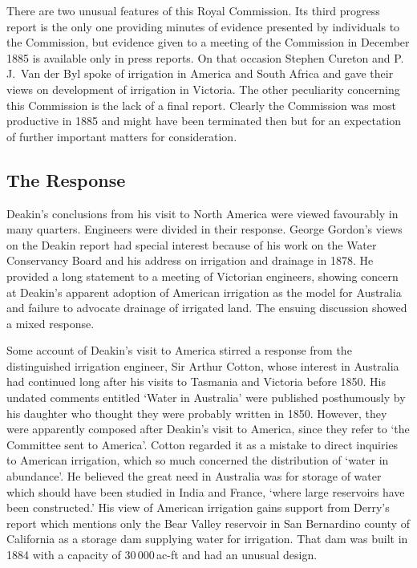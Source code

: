 There are two unusual features of this Royal Commission.  Its third
progress report is the only one providing minutes of evidence
presented by individuals to the Commission, but evidence given to a
meeting of the Commission in December 1885 is available only in press
reports.  On that occasion Stephen Cureton and P.\,J.~Van der Byl
spoke of irrigation in America and South Africa and gave their views
on development of irrigation in Victoria.  The other peculiarity concerning this Commission is the
lack of a final report.  Clearly the Commission was most productive in
1885 and might have been terminated then but for an expectation of
further important matters for consideration.

\subsection*{The Response}

Deakin's conclusions from his visit to North America were viewed
favourably in many quarters.  Engineers were divided in their
response.  George Gordon's views on the Deakin report had special
interest because of his work on the Water Conservancy Board and his
address on irrigation and drainage in 1878.  He provided a long
statement to a meeting of Victorian engineers, showing concern at
Deakin's apparent adoption of American irrigation as the model for
Australia and failure to advocate drainage of irrigated land.  The
ensuing discussion showed a mixed response.

Some account of Deakin's visit to America stirred a response from the
distinguished irrigation engineer, Sir Arthur Cotton, whose interest
in Australia had continued long after his visits to Tasmania and
Victoria before 1850.  His undated comments entitled `Water in
Australia' were published posthumously by his daughter who thought
they were probably written in 1850.  However, they were apparently composed after Deakin's visit
to America, since they refer to `the Committee sent to America'.
Cotton regarded it as a mistake to direct inquiries to American
irrigation, which so much concerned the distribution of `water in
abundance'.  He believed the great need in Australia was for storage
of water which should have been studied in India and France, `where
large reservoirs have been constructed.'  His view of American
irrigation gains support from Derry's report which mentions only the
Bear Valley reservoir in San Bernardino county of California as a
storage dam supplying water for irrigation.  That dam was built in 1884 with a capacity of 30\,000\,ac-ft
and had an unusual design.

